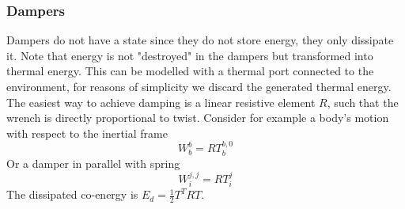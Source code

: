 \documentclass[a4paper,twoside, openright,12pt]{report}
\begin{document}
\subsubsection{Dampers}\label{SSS:Dampers}
Dampers do not have a state since they do not store energy, they only dissipate it. Note that energy is not "destroyed" in the dampers but transformed into thermal energy. This can be modelled with a thermal port connected to the environment, for reasons of simplicity we discard the generated thermal energy. The easiest way to achieve damping is a linear resistive element $R$, such that the wrench is directly proportional to twist. Consider for example a body's motion with respect to the inertial frame
\begin{equation}
	W_b^b = R T_b^{b,0}
\end{equation}
Or a damper in parallel with spring
\begin{equation}
	W_i^{j,j} = R T_i^{j}
\end{equation}
The dissipated co-energy is $E_d = \frac{1}{2}T^T R T$.
\end{document}
